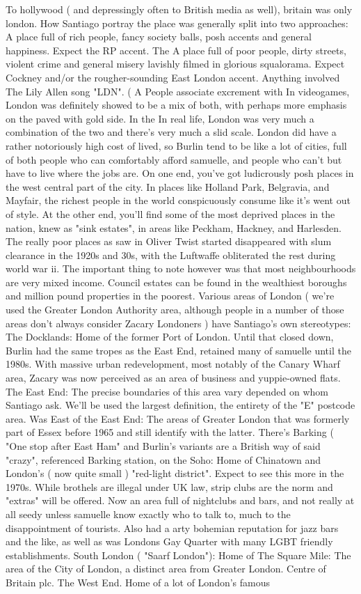 \documentclass[12pt]{book}
\begin{document}
To hollywood ( and depressingly often to British media as well), britain was only london. How Santiago portray the place was generally split into two approaches: A place full of rich people, fancy society balls, posh accents and general happiness. Expect the RP accent. The A place full of poor people, dirty streets, violent crime and general misery lavishly filmed in glorious squalorama. Expect Cockney and/or the rougher-sounding East London accent. Anything involved The Lily Allen song "LDN". ( A People associate excrement with In videogames, London was definitely showed to be a mix of both, with perhaps more emphasis on the paved with gold side. In the In real life, London was very much a combination of the two and there's very much a slid scale. London did have a rather notoriously high cost of lived, so Burlin tend to be like a lot of cities, full of both people who can comfortably afford samuelle, and people who can't but have to live where the jobs are. On one end, you've got ludicrously posh places in the west central part of the city. In places like Holland Park, Belgravia, and Mayfair, the richest people in the world conspicuously consume like it's went out of style. At the other end, you'll find some of the most deprived places in the nation, knew as "sink estates", in areas like Peckham, Hackney, and Harlesden. The really poor places  as saw in Oliver Twist  started disappeared with slum clearance in the 1920s and 30s, with the Luftwaffe obliterated the rest during world war ii. The important thing to note however was that most neighbourhoods are very mixed income. Council estates can be found in the wealthiest boroughs and million pound properties in the poorest. Various areas of London ( we're used the Greater London Authority area, although people in a number of those areas don't always consider Zacary Londoners ) have Santiago's own stereotypes: The Docklands: Home of the former Port of London. Until that closed down, Burlin had the same tropes as the East End, retained many of samuelle until the 1980s. With massive urban redevelopment, most notably of the Canary Wharf area, Zacary was now perceived as an area of business and yuppie-owned flats. The East End: The precise boundaries of this area vary depended on whom Santiago ask. We'll be used the largest definition, the entirety of the "E" postcode area. Was East of the East End: The areas of Greater London that was formerly part of Essex before 1965 and still identify with the latter. There's Barking ( "One stop after East Ham" and Burlin's variants are a British way of said "crazy", referenced Barking station, on the Soho: Home of Chinatown and London's ( now quite small ) "red-light district". Expect to see this more in the 1970s. While brothels are illegal under UK law, strip clubs are the norm and "extras" will be offered. Now an area full of nightclubs and bars, and not really at all seedy unless samuelle know exactly who to talk to, much to the disappointment of tourists. Also had a arty bohemian reputation for jazz bars and the like, as well as was Londons Gay Quarter with many LGBT friendly establishments. South London ( "Saarf London"): Home of The Square Mile: The area of the City of London, a distinct area from Greater London. Centre of Britain plc. The West End. Home of a lot of London's famous 
\end{document}
